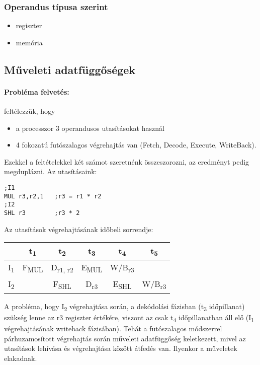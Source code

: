 \subsubsection{Operandus típusa szerint}
\begin{itemize}
    \item regiszter
    \item memória
\end{itemize}

\subsection{Műveleti adatfüggőségek}
\paragraph{Probléma felvetés:} feltélezzük, hogy
\begin{itemize}
    \item a processzor 3 operandusos utasításokat használ
    \item 4 fokozatú futószalagos végrehajtás van (Fetch, Decode, Execute, WriteBack).
\end{itemize}
Ezekkel a feltételekkel két számot szeretnénk összeszorozni, az eredményt pedig megduplázni. Az utasításaink:
\begin{lstlisting}[language=Ant]
;I1
MUL r3,r2,1   ;r3 = r1 * r2
;I2
SHL r3        ;r3 * 2
\end{lstlisting}
Az utasítások végrehajtásának időbeli sorrendje:
\begin{center}
    \begin{tabular}{ c | c | c | c | c | c}
                           & t\textsubscript{1}   & t\textsubscript{2}      & t\textsubscript{3}   & t\textsubscript{4}    & t\textsubscript{5}    \\
        \hline
        I\textsubscript{1} & F\textsubscript{MUL} & D\textsubscript{r1, r2} & E\textsubscript{MUL} & W/B\textsubscript{r3} &                       \\
        \hline
        I\textsubscript{2} &                      & F\textsubscript{SHL}    & D\textsubscript{r3}  & E\textsubscript{SHL}  & W/B\textsubscript{r3}
    \end{tabular}
\end{center}
A probléma, hogy I\textsubscript{2} végrehajtása során, a dekódolási fázisban (t\textsubscript{3} időpillanat) szükség lenne az r3 regiszter értékére, viszont az csak t\textsubscript{4} időpillanatban áll elő (I\textsubscript{1} végrehajtásának writeback fázisában).
Tehát a futószalagos módszerrel párhuzamosított végrehajtás során műveleti adatfüggőség keletkezett, mivel az utasítások lehívása és végrehajtása között átfedés van.
Ilyenkor a műveletek elakadnak.
